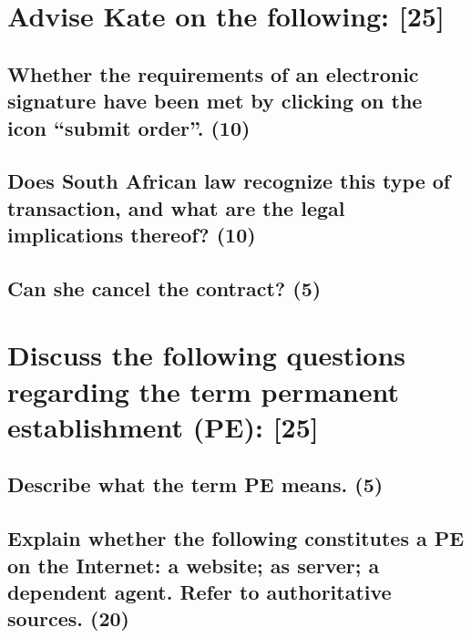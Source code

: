 \documentclass[11pt]{article}
\begin{document}
\section{Advise Kate on the following: [25]}
\label{sec:orgba48d1c}

\subsection{Whether the requirements of an electronic signature have been met by clicking on the icon ``submit order''. (10)}
\label{sec:org1dbb71c}

\subsection{Does South African law recognize this type of transaction, and what are the legal implications thereof? (10)}
\label{sec:orga74001d}

\subsection{Can she cancel the contract? (5)}
\label{sec:org659a589}

\section{Discuss the following questions regarding the term permanent establishment (PE): [25]}
\label{sec:org424ac58}

\subsection{Describe what the term PE means. (5)}
\label{sec:orgf419637}

\subsection{Explain whether the following constitutes a PE on the Internet: a website; as server; a dependent agent. Refer to authoritative sources. (20)}
\label{sec:org68a82da}

\printbibliography
\end{document}
